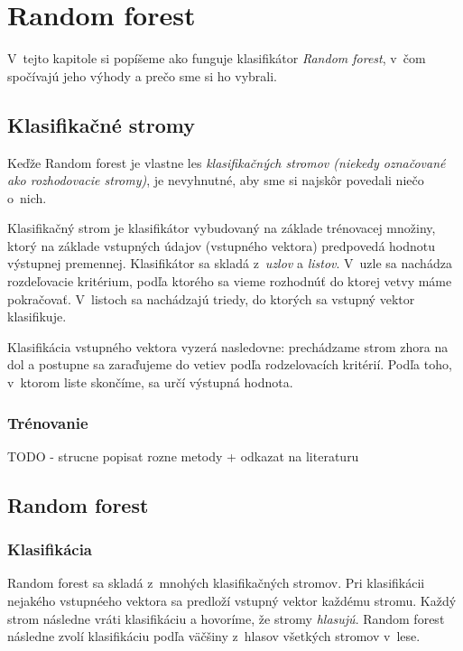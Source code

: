 \chapter{Random forest}

V~tejto kapitole si popíšeme ako funguje klasifikátor \textit{Random forest}, v~čom spočívajú jeho výhody a prečo sme si ho vybrali.

\section{Klasifikačné stromy}
Keďže Random forest je vlastne les \textit{klasifikačných stromov (niekedy označované ako rozhodovacie stromy)}, je nevyhnutné, aby sme si najskôr povedali niečo o~nich.

Klasifikačný strom je klasifikátor vybudovaný na základe trénovacej množiny, ktorý na základe vstupných údajov (vstupného vektora) predpovedá hodnotu výstupnej premennej. Klasifikátor sa skladá z~\textit{uzlov} a \textit{listov}. V~uzle sa nachádza rozdeľovacie kritérium, podľa ktorého sa vieme rozhodnúť do ktorej vetvy máme pokračovať. V~listoch sa nachádzajú triedy, do ktorých sa vstupný vektor klasifikuje.

Klasifikácia vstupného vektora vyzerá nasledovne: prechádzame strom zhora na dol a postupne sa zaraďujeme do vetiev podľa rodzelovacích kritérií. Podľa toho, v~ktorom liste skončíme, sa určí výstupná hodnota.

\subsection{Trénovanie}
TODO - strucne popisat rozne metody + odkazat na literaturu

\section{Random forest}

\subsection{Klasifikácia}
Random forest sa skladá z~mnohých klasifikačných stromov. Pri klasifikácii nejakého vstupnéeho vektora sa predloží vstupný vektor každému stromu. Každý strom následne vráti klasifikáciu a hovoríme, že stromy \textit{hlasujú}. Random forest následne zvolí klasifikáciu podľa väčšiny z~hlasov všetkých stromov v~lese.

